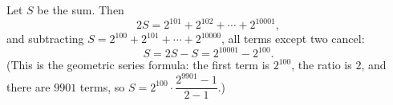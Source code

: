 Let $S$ be the sum. Then
\[2S=2^{101}+2^{102}+\cdots+2^{10001},\]
and subtracting $S=2^{100}+2^{101}+\cdots+2^{10000}$, all terms except two cancel:
\[S=2S-S=\boxed{2^{10001}-2^{100}}.\]
(This is the geometric series formula: the first term is $2^{100}$, the ratio is $2$, and there are $9901$ terms, so $S=2^{100}\cdot\dfrac{2^{9901}-1}{2-1}$.)
